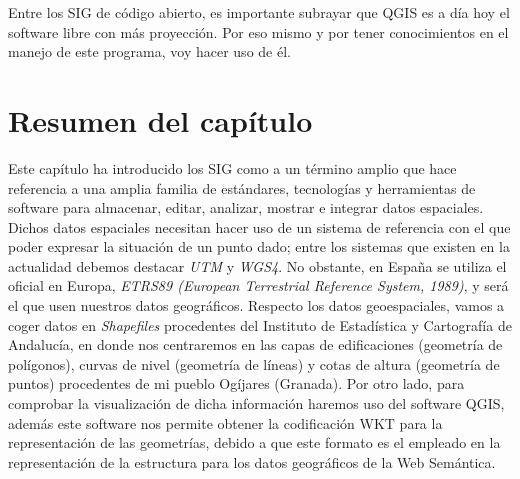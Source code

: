 Entre los SIG de código abierto, es importante subrayar que QGIS es a día hoy el software libre con más proyección. Por eso mismo y por tener conocimientos en el manejo de este programa, voy hacer uso de él. %



\section{Resumen del capítulo}

Este capítulo ha introducido los SIG como a un término amplio que hace referencia a una amplia familia de estándares, tecnologías y herramientas de software para almacenar, editar, analizar, mostrar e integrar datos espaciales. Dichos datos espaciales necesitan hacer uso de un sistema de referencia con el que poder expresar la situación de un punto dado; entre los sistemas que existen en la actualidad debemos destacar \textit{UTM} y \textit{WGS4}. No obstante, en España se utiliza el oficial en Europa, \textit{ETRS89 (European Terrestrial Reference System, 1989)}, y será el que usen nuestros datos geográficos. Respecto los datos geoespaciales, vamos a coger datos en \textit{Shapefiles} procedentes del Instituto de Estadística y Cartografía de Andalucía, en donde nos centraremos en las capas de edificaciones (geometría de polígonos), curvas de nivel (geometría de líneas) y cotas de altura (geometría de puntos) procedentes de mi pueblo Ogíjares (Granada). Por otro lado, para comprobar la visualización de dicha información haremos uso del software QGIS, además este software nos permite obtener la codificación WKT para la representación de las geometrías, debido a que este formato es el empleado en la representación de la estructura para los datos geográficos de la Web Semántica. 
